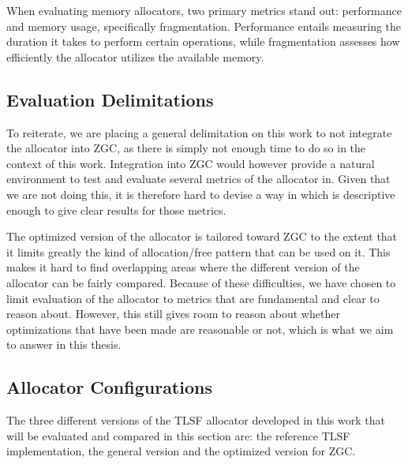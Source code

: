 
When evaluating memory allocators, two primary metrics stand out: performance and memory usage, specifically fragmentation. Performance entails measuring the duration it takes to perform certain operations, while fragmentation assesses how efficiently the allocator utilizes the available memory.

\subsection{Evaluation Delimitations}

To reiterate, we are placing a general delimitation on this work to not integrate the allocator into ZGC, as there is simply not enough time to do so in the context of this work. Integration into ZGC would however provide a natural environment to test and evaluate several metrics of the allocator in. Given that we are not doing this, it is therefore hard to devise a way in which is descriptive enough to give clear results for those metrics.

The optimized version of the allocator is tailored toward ZGC to the extent that it limits greatly the kind of allocation/free pattern that can be used on it. This makes it hard to find overlapping areas where the different version of the allocator can be fairly compared. Because of these difficulties, we have chosen to limit evaluation of the allocator to metrics that are fundamental and clear to reason about. However, this still gives room to reason about whether optimizations that have been made are reasonable or not, which is what we aim to answer in this thesis.

\subsection{Allocator Configurations}



The three different versions of the TLSF allocator developed in this work that will be evaluated and compared in this section are: the reference TLSF implementation, the general version and the optimized version for ZGC. 


